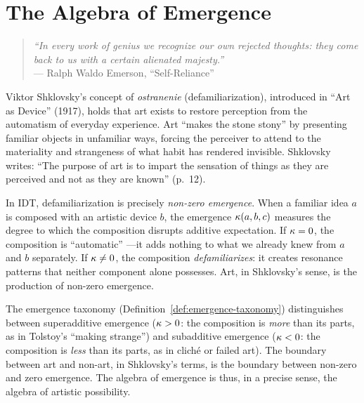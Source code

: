 
\chapter{The Algebra of Emergence}

\begin{quote}
\textit{``In every work of genius we recognize our own rejected thoughts:
they come back to us with a certain alienated majesty.''}\\
\hfill --- Ralph Waldo Emerson, ``Self-Reliance''
\end{quote}

\begin{interpretation}\label{interp:ch5:shklovsky_defamiliarization}
Viktor Shklovsky's concept of \emph{ostranenie} (defamiliarization),
introduced in ``Art as Device'' (1917), holds that art exists to restore
perception from the automatism of everyday experience. Art ``makes the
stone stony'' by presenting familiar objects in unfamiliar ways, forcing
the perceiver to attend to the materiality and strangeness of what habit
has rendered invisible. Shklovsky writes: ``The purpose of art is to
impart the sensation of things as they are perceived and not as they
are known'' (p.~12).

In IDT, defamiliarization is precisely \emph{non-zero emergence}. When
a familiar idea $a$ is composed with an artistic device $b$, the emergence
$\kappa(a, b, c)$ measures the degree to which the composition disrupts
additive expectation. If $\kappa = 0$, the composition is ``automatic''
---it adds nothing to what we already knew from $a$ and $b$ separately.
If $\kappa \neq 0$, the composition \emph{defamiliarizes}: it creates
resonance patterns that neither component alone possesses. Art, in
Shklovsky's sense, is the production of non-zero emergence.

The emergence taxonomy (Definition~\ref{def:emergence-taxonomy})
distinguishes between superadditive emergence ($\kappa > 0$: the
composition is \emph{more} than its parts, as in Tolstoy's ``making
strange'') and subadditive emergence ($\kappa < 0$: the composition
is \emph{less} than its parts, as in clich\'e or failed art). The
boundary between art and non-art, in Shklovsky's terms, is the
boundary between non-zero and zero emergence. The algebra of emergence
is thus, in a precise sense, the algebra of artistic possibility.
\end{interpretation}

